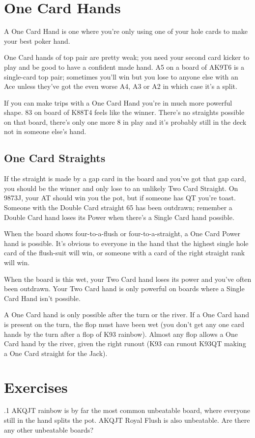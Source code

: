 \section{One Card Hands}

A One Card Hand is one where you're only using one of your hole
cards to make your best poker hand.

One Card hands of top pair are pretty weak; you need your second card
kicker to play and be good to have a confident made hand. A5 on a
board of AK9T6 is a single-card top pair; sometimes you'll win but you
lose to anyone else with an Ace unless they've got the even worse A4,
A3 or A2 in which case it's a split.

If you can make trips with a One Card Hand you're in much more
powerful shape. 83 on board of K88T4 feels like the winner. There's no
straights possible on that board, there's only one more 8 in play and
it's probably still in the deck not in someone else's hand.

\subsection{One Card Straights}

If the straight is made by a gap card in the board and you've got that
gap card, you should be the winner and only lose to an unlikely Two
Card Straight. On 9873J, your AT should win you the pot, but if
someone has QT you're toast. Someone with the Double Card straight 65
has been outdrawn; remember a Double Card hand loses its Power when
there's a Single Card hand possible.

When the board shows four-to-a-flush or four-to-a-straight, a One
Card Power hand is possible. It's obvious to everyone in the hand that
the highest single hole card of the flush-suit will win, or someone
with a card of the right straight rank will win.

When the board is this wet, your Two Card hand loses its power and
you've often been outdrawn. Your Two Card hand is only powerful on
boards where a Single Card Hand isn't possible.

A One Card hand is only possible after the turn or the river. If a
One Card hand is present on the turn, the flop must have been wet
(you don't get any one card hands by the turn after a flop of K93
rainbow). Almost any flop allows a One Card hand by the river,
given the right runout (K93 can runout K93QT making a One Card
straight for the Jack).

\section{Exercises}

.1 AKQJT rainbow is by far the most common unbeatable
board, where everyone still in the hand splits the pot. AKQJT Royal
Flush is also unbeatable. Are there any other unbeatable boards?
